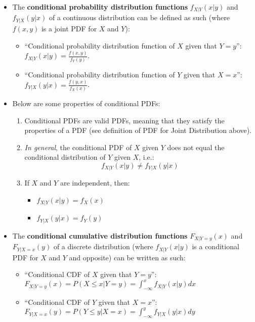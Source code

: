 \documentclass[12pt]{article}
\begin{document}
\begin{itemize}
	\item The \textbf{conditional probability distribution functions} $f_{X | Y}(x|y)$ and $f_{Y | X}(y|x)$ of a continuous distribution can be defined as such (where $f(x, y)$ is a joint PDF for $X$ and $Y$):
	      \begin{itemize}
		      \item ``Conditional probability distribution function of $X$ given that $Y=y$'': $f_{X | Y}(x|y) = \frac{f(x, y)}{f_Y(y)}$.
		      \item ``Conditional probability distribution function of $Y$ given that $X=x$'': $f_{Y | X}(y|x) = \frac{f(y, x)}{f_X(x)}$.
	      \end{itemize}
	\item Below are some properties of conditional PDFs:
	      \begin{enumerate}
		      \item Conditional PDFs are valid PDFs, meaning that they satisfy the properties of a PDF (see definition of PDF for Joint Distribution above).
		      \item \emph{In general}, the conditional PDF of $X$ given $Y$ does not equal the conditional distribution of $Y$ given $X$, i.e.:
		            \[
			            f_{X|Y}(x | y) \neq  f_{Y|X}(y | x)
		            \]
		      \item If $X$ and $Y$ are independent, then:
		            \begin{itemize}
			            \item $f_{X|Y}(x | y) = f_X(x)$
			            \item $f_{Y|X}(y | x) = f_Y(y)$
		            \end{itemize}
	      \end{enumerate}
	\item The \textbf{conditional cumulative distribution functions} $F_{X|Y=y}
		      (x)$ and $F_{Y|X=x} (y)$ of a discrete distribution (where
	      $f_{X|Y}(x|y)$ is a conditional PDF for $X$ and $Y$ and opposite)
	      can be written as
	      such:
	      \begin{itemize}
		      \item ``Conditional CDF of $X$ given that $Y=y$'': $F_{X|Y=y} (x) = P(X \leq x | Y = y) = \int_{-\infty}^{x} f_{X|Y}(x | y)dx$
		      \item ``Conditional CDF of $Y$ given that $X=x$'': $F_{Y|X=x} (y) = P(Y \leq y | X = x) = \int_{-\infty}^{y} f_{Y|X}(y | x)dy$
	      \end{itemize}

\end{itemize}
\end{document}
